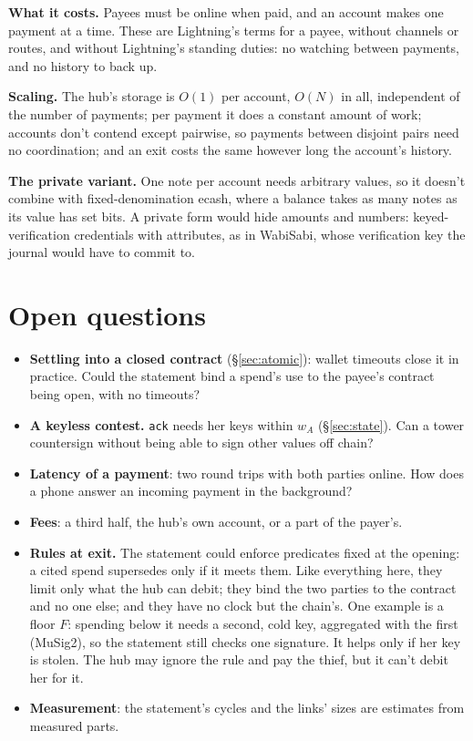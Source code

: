 \documentclass[11pt]{article}
\theoremstyle{plain}
\theoremstyle{definition}
\newcommand{\tx}[1]{\texttt{#1}}
\begin{document}
\textbf{What it costs.} Payees must be online when paid, and an account
makes one payment at a time. These are Lightning's terms for a payee,
without channels or routes, and without Lightning's standing duties:
no watching between payments, and no history to back up.

\textbf{Scaling.} The hub's storage is $O(1)$ per account, $O(N)$ in
all, independent of the number of payments; per payment it does a
constant amount of work; accounts don't contend except pairwise, so
payments between disjoint pairs need no coordination; and an exit costs
the same however long the account's history.

\textbf{The private variant.} One note per account needs arbitrary
values, so it doesn't combine with fixed-denomination ecash, where a
balance takes as many notes as its value has set bits. A private form
would hide amounts and numbers: keyed-verification credentials with
attributes, as in WabiSabi, whose verification key the journal would
have to commit to.

\section{Open questions}\label{sec:open}

\begin{itemize}[nosep]
\item \textbf{Settling into a closed contract} (\S\ref{sec:atomic}):
  wallet timeouts close it in practice. Could the statement bind a
  spend's use to the payee's contract being open, with no timeouts?
\item \textbf{A keyless contest.} \tx{ack} needs her keys within $w_A$
  (\S\ref{sec:state}). Can a tower countersign without being able to
  sign other values off chain?
\item \textbf{Latency of a payment}: two round trips with both parties
  online. How does a phone answer an incoming payment in the background?
\item \textbf{Fees}: a third half, the hub's own account, or a part of
  the payer's.
\item \textbf{Rules at exit.} The statement could enforce predicates
  fixed at the opening: a cited spend supersedes only if it meets them.
  Like everything here, they limit only what the hub can debit; they
  bind the two parties to the contract and no one else; and they have
  no clock but the chain's. One example is a floor $F$: spending below
  it needs a second, cold key, aggregated with the first (MuSig2), so
  the statement still checks one signature. It helps only if her key is
  stolen. The hub may ignore the rule and pay the thief, but it can't
  debit her for it.
\item \textbf{Measurement}: the statement's cycles and the links' sizes
  are estimates from measured parts.
\end{itemize}
\end{document}
